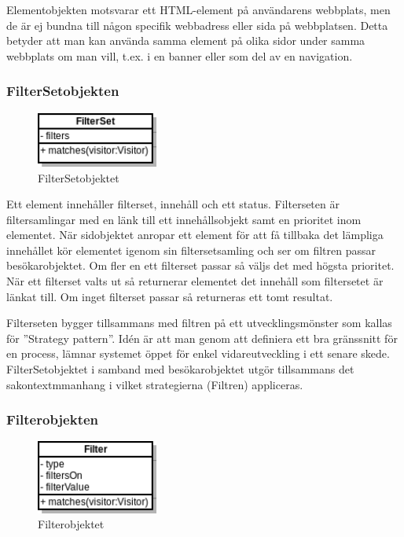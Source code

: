 Elementobjekten motsvarar ett HTML-element på användarens webbplats, men de är ej bundna till någon specifik webbadress eller sida på webbplatsen. Detta betyder att man kan använda samma element på olika sidor under samma webbplats om man vill, t.ex. i en banner eller som del av en navigation.

\subsubsection{FilterSetobjekten}

\begin{figure}[h!]
\centering
\includegraphics[width=40mm]{assets/images/umlFilterSet.png}
\caption{FilterSetobjektet}
\label{filtersetuml}
\end{figure}

Ett element innehåller filterset, innehåll och ett status. Filterseten är filtersamlingar med en länk till ett innehållsobjekt samt en prioritet inom elementet. När sidobjektet anropar ett element för att få tillbaka det lämpliga innehållet kör elementet igenom sin filtersetsamling och ser om filtren passar besökarobjektet. Om fler en ett filterset passar så väljs det med högsta prioritet. När ett filterset valts ut så returnerar elementet det innehåll som filtersetet är länkat till. Om inget filterset passar så returneras ett tomt resultat.

Filterseten bygger tillsammans med filtren på ett utvecklingsmönster som kallas för ''Strategy pattern''. Idén är att man genom att definiera ett bra gränssnitt för en process, lämnar systemet öppet för enkel vidareutveckling i ett senare skede. \citep[s. 349]{gof} FilterSetobjektet i samband med besökarobjektet utgör tillsammans det sakontextmmanhang i vilket strategierna (Filtren) appliceras.

\subsubsection{Filterobjekten}

\begin{figure}[h!]
\centering
\includegraphics[width=40mm]{assets/images/umlFilter.png}
\caption{Filterobjektet}
\label{filteruml}
\end{figure}


